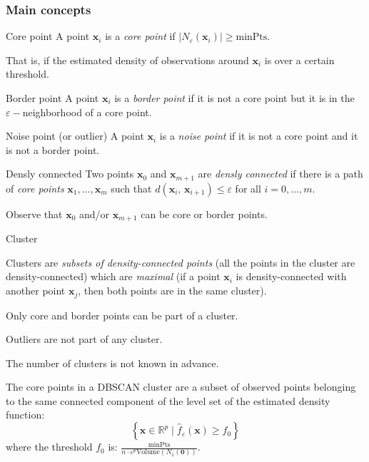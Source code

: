 \subsubsection{Main concepts}
\begin{definition}{Core point}{}
    A point $\boldsymbol{x}_i$ is a \emph{core point} if $|N_{\varepsilon}(\boldsymbol{x}_i)| \geq \text{minPts}$.

    That is, if the estimated density of observations around $\boldsymbol{x}_i$ is over a certain threshold.
\end{definition}

\begin{definition}{Border point}{}
    A point $\boldsymbol{x}_i$ is a \emph{border point} if it is not a core point but it is
    in the $\varepsilon-$neighborhood of a core point.
\end{definition}

\begin{definition}{Noise point (or outlier)}{}
    A point $\boldsymbol{x}_i$ is a \emph{noise point} if it is not a core point and it is not a border point.
\end{definition}

\begin{definition}{Densly connected}{}
    Two points $\boldsymbol{x}_0$ and $\boldsymbol{x}_{m+1}$ are \emph{densly connected} if
    there is a path of \emph{core points} $\boldsymbol{x}_1, \ldots, \boldsymbol{x}_{m}$ such
    that $d(\boldsymbol{x}_i,\,\boldsymbol{x}_{i+1}) \leq \varepsilon$ for all $i = 0, \ldots, m$.

    \tcblower
    Observe that $\boldsymbol{x}_0$ and/or $\boldsymbol{x}_{m+1}$ can be core or border points.
\end{definition}

\begin{definition}{Cluster}{}
    
    Clusters are \emph{subsets of density-connected points} (all the points in the cluster are
    density-connected) which are \emph{maximal} (if a point $\boldsymbol{x}_i$ is density-connected
    with another point $\boldsymbol{x}_j$, then both points are in the same cluster).

    \tcblower

    Only core and border points can be part of a cluster.

    Outliers are not part of any cluster.

    The number of clusters is not known in advance.

    The core points in a DBSCAN cluster are a subset of observed points belonging to the same
    connected component of the level set of the estimated density function:
    \begin{equation*}
        \left\{
            \boldsymbol x \in \mathds{R}^p \mid \hat{f}_\varepsilon(\boldsymbol x) \geq f_0
        \right\}
    \end{equation*}
    where the threshold $f_0$ is: $\frac{\text{minPts}}{n \cdot \varepsilon^p \text{Volume}(N_{1}(\boldsymbol{0}))}$.
    
\end{definition}

